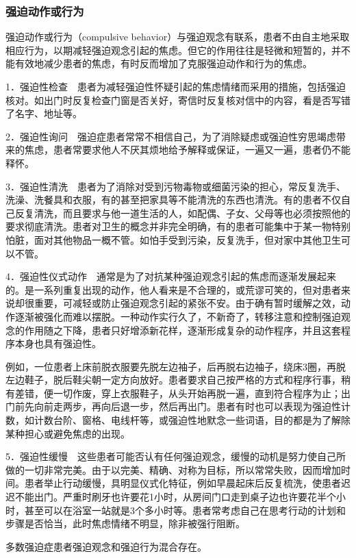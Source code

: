\subsubsection{强迫动作或行为}

强迫动作或行为（compulsive
behavior）与强迫观念有联系，患者不由自主地采取相应行为，以期减轻强迫观念引起的焦虑。但它的作用往往是轻微和短暂的，并不能有效地减少患者的焦虑，有时反而增加了克服强迫动作和行为的焦虑。

1．强迫性检查　患者为减轻强迫性怀疑引起的焦虑情绪而采用的措施，包括强迫核对。如出门时反复检查门窗是否关好，寄信时反复核对信中的内容，看是否写错了名字、地址等。

2．强迫性询问　强迫症患者常常不相信自己，为了消除疑虑或强迫性穷思竭虑带来的焦虑，患者常要求他人不厌其烦地给予解释或保证，一遍又一遍，患者仍不能释怀。

3．强迫性清洗　患者为了消除对受到污物毒物或细菌污染的担心，常反复洗手、洗澡、洗餐具和衣服，有的甚至把家具等不能清洗的东西也清洗。有的患者不仅自己反复清洗，而且要求与他一道生活的人，如配偶、子女、父母等也必须按照他的要求彻底清洗。患者对卫生的概念并非完全明确，有的患者可能集中于某一物特别怕脏，面对其他物品一概不管。如怕手受到污染，反复洗手，但对家中其他卫生可以不管。

4．强迫性仪式动作　通常是为了对抗某种强迫观念引起的焦虑而逐渐发展起来的。是一系列重复出现的动作，他人看来是不合理的，或荒谬可笑的，但对患者来说却很重要，可减轻或防止强迫观念引起的紧张不安。由于确有暂时缓解之效，动作逐渐被强化而难以摆脱。一种动作实行久了，不新奇了，转移注意和控制强迫观念的作用随之下降，患者只好增添新花样，逐渐形成复杂的动作程序，并且这套程序本身也具有强迫性。

例如，一位患者上床前脱衣服要先脱左边袖子，后再脱右边袖子，绕床3圈，再脱左边鞋子，脱后鞋尖朝一定方向放好。患者要求自己按严格的方式和程序行事，稍有差错，便一切作废，穿上衣服鞋子，从头开始再脱一遍，直到符合程序为止；出门前先向前走两步，再向后退一步，然后再出门。患者有时也可以表现为强迫性计数，如计数台阶、窗格、电线杆等，或强迫性地默念一些词语，目的都是为了解除某种担心或避免焦虑的出现。

5．强迫性缓慢　这些患者可能否认有任何强迫观念，缓慢的动机是努力使自己所做的一切非常完美。由于以完美、精确、对称为目标，所以常常失败，因而增加时间。患者举止行动缓慢，具明显仪式化特征，例如早晨起床后反复梳洗，使患者迟迟不能出门。严重时刷牙也许要花1小时，从房间门口走到桌子边也许要花半个小时，甚至可以在浴室一站就是3个多小时等。患者常考虑自己在思考行动的计划和步骤是否恰当，此时焦虑情绪不明显，除非被强行阻断。

多数强迫症患者强迫观念和强迫行为混合存在。

